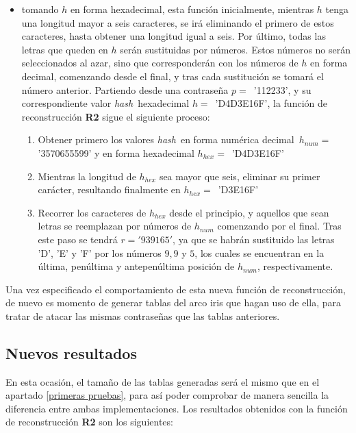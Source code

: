 \documentclass[12pt,spanish,listoffigures,listoftables,listofalgorithms]{tfgetsinf}
\newcommand{\hash}{\textit{hash}}
\begin{document}
\begin{itemize}

	\item tomando $h$ en forma hexadecimal, esta función inicialmente, mientras $h$ tenga una longitud mayor a seis caracteres, se irá eliminando el primero de estos caracteres, hasta obtener una longitud igual a seis. Por último, todas las letras que queden en $h$ serán sustituidas por números. Estos números no serán seleccionados al azar, sino que corresponderán con los números de $h$ en forma decimal, comenzando desde el final, y tras cada sustitución se tomará el número anterior. Partiendo desde una contraseña $p =$~'112233', y su correspondiente valor \hash~hexadecimal $h =$~'D4D3E16F', la función de reconstrucción \textbf{R2} sigue el siguiente proceso:

		\begin{enumerate}
				
			\item Obtener primero los valores \hash~en forma numérica decimal~$h_{num} =$\\
			'3570655599' y en forma hexadecimal $h_{hex} =$~'D4D3E16F'

			\item Mientras la longitud de $h_{hex}$ sea mayor que seis, eliminar su primer carácter, resultando finalmente en $h_{hex} =$~'D3E16F'
		
			\item Recorrer los caracteres de $h_{hex}$ desde el principio, y aquellos que sean letras se reemplazan por números de $h_{num}$ comenzando por el final. Tras este paso se tendrá $r = '939165'$, ya que se habrán sustituido las letras 'D', 'E' y 'F' por los números $9, 9$ y $5$, los cuales se encuentran en la última, penúltima y antepenúltima posición de $h_{num}$, respectivamente.

		\end{enumerate}

\end{itemize}

Una vez especificado el comportamiento de esta nueva función de reconstrucción, de nuevo es momento de generar tablas del arco iris que hagan uso de ella, para tratar de atacar las mismas contraseñas que las tablas anteriores.

\subsection{Nuevos resultados}

En esta ocasión, el tamaño de las tablas generadas será el mismo que en el apartado \ref{primeras pruebas}, para así poder comprobar de manera sencilla la diferencia entre ambas implementaciones. Los resultados obtenidos con la función de reconstrucción \textbf{R2} son los siguientes:
\end{document}
